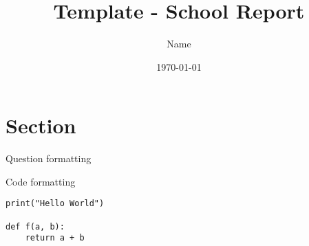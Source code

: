 \documentclass{article}
\title{Template - School Report}
\date{\today}
\author{Name}
\begin{document}

\thispagestyle{firstpage}

\begin{center}
    \huge\bfseries{\@title}
\end{center}

\section{Section}

\begin{question}
    \item Question formatting
    \item Code formatting
\begin{verbatim}
print("Hello World")

def f(a, b):
    return a + b
\end{verbatim}
\end{question}
\end{document}
